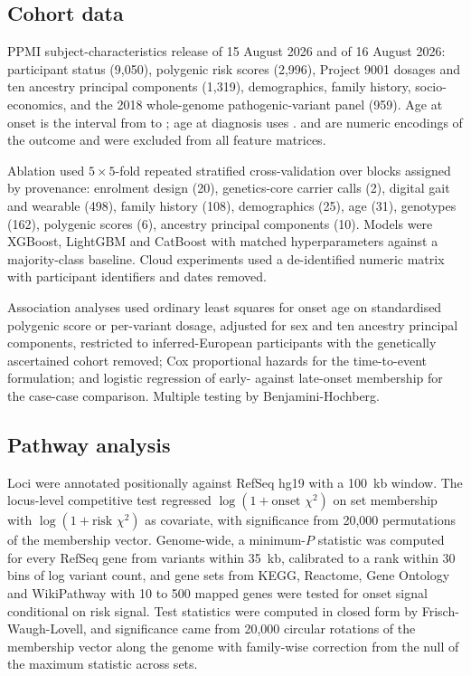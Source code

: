 \documentclass[10pt]{article}
\begin{document}
\subsection*{Cohort data}

PPMI subject-characteristics release of 15 August 2026 and  of 16
August 2026: participant status (9,050), polygenic risk scores (2,996), Project 9001 dosages and
ten ancestry principal components (1,319), demographics, family history, socio-economics, and the
2018 whole-genome pathogenic-variant panel (959). Age at onset is the interval from 
to ; age at diagnosis uses .  and  are numeric
encodings of the outcome and were excluded from all feature matrices.

Ablation used $5\times5$-fold repeated stratified cross-validation over blocks assigned by
provenance: enrolment design (20), genetics-core carrier calls (2), digital gait and wearable
(498), family history (108), demographics (25), age (31), genotypes (162), polygenic scores (6),
ancestry principal components (10). Models were XGBoost, LightGBM and CatBoost with matched
hyperparameters against a majority-class baseline. Cloud experiments used a de-identified numeric
matrix with participant identifiers and dates removed.

Association analyses used ordinary least squares for onset age on standardised polygenic score or
per-variant dosage, adjusted for sex and ten ancestry principal components, restricted to
inferred-European participants with the genetically ascertained cohort removed; Cox proportional
hazards for the time-to-event formulation; and logistic regression of early- against late-onset
membership for the case-case comparison. Multiple testing by Benjamini-Hochberg.

\subsection*{Pathway analysis}

Loci were annotated positionally against RefSeq hg19 with a 100~kb window. The locus-level
competitive test regressed $\log(1 + \text{onset }\chi^2)$ on set membership with
$\log(1 + \text{risk }\chi^2)$ as covariate, with significance from 20,000 permutations of the
membership vector. Genome-wide, a minimum-$P$ statistic was computed for every RefSeq gene from
variants within 35~kb, calibrated to a rank within 30 bins of log variant count, and gene sets
from KEGG, Reactome, Gene Ontology and WikiPathway with 10 to 500 mapped genes were tested for
onset signal conditional on risk signal. Test statistics were computed in closed form by
Frisch-Waugh-Lovell, and significance came from 20,000 circular rotations of the membership vector
along the genome with family-wise correction from the null of the maximum statistic across sets.
\end{document}
